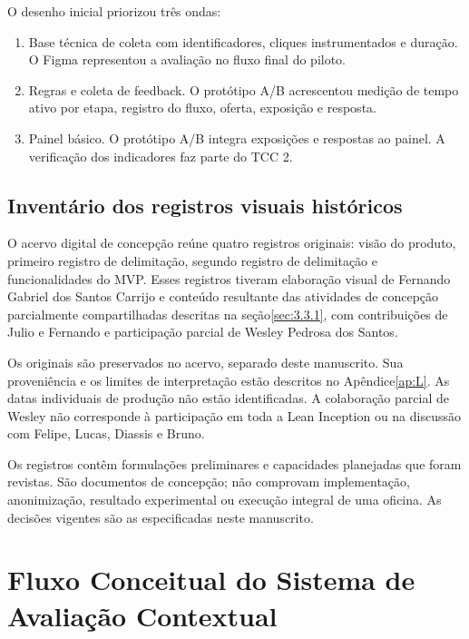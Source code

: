 \begin{apendicesenv}
O desenho inicial priorizou três ondas:

\begin{enumerate}
\def\labelenumi{\arabic{enumi}.}

\item
  Base técnica de coleta com identificadores, cliques instrumentados e duração. O Figma representou a avaliação no fluxo final do piloto.
\item
  Regras e coleta de feedback. O protótipo A/B acrescentou medição de tempo ativo por etapa, registro do fluxo, oferta, exposição e resposta.
\item
  Painel básico. O protótipo A/B integra exposições e respostas ao painel. A verificação dos indicadores faz parte do TCC 2.
\end{enumerate}

\section{Inventário dos registros visuais históricos}
\label{sec:A.4}

O acervo digital de concepção reúne quatro registros originais: visão do produto, primeiro registro de delimitação, segundo registro de delimitação e funcionalidades do MVP. Esses registros tiveram elaboração visual de Fernando Gabriel dos Santos Carrijo e conteúdo resultante das atividades de concepção parcialmente compartilhadas descritas na seção\nobreakspace{}\ref{sec:3.3.1}, com contribuições de Julio e Fernando e participação parcial de Wesley Pedrosa dos Santos.

Os originais são preservados no acervo, separado deste manuscrito. Sua proveniência e os limites de interpretação estão descritos no Apêndice\nobreakspace{}\ref{ap:L}. As datas individuais de produção não estão identificadas. A colaboração parcial de Wesley não corresponde à participação em toda a Lean Inception ou na discussão com Felipe, Lucas, Diassis e Bruno.

Os registros contêm formulações preliminares e capacidades planejadas que foram revistas. São documentos de concepção; não comprovam implementação, anonimização, resultado experimental ou execução integral de uma oficina. As decisões vigentes são as especificadas neste manuscrito.

\chapter{Fluxo Conceitual do Sistema de Avaliação Contextual}
\label{ap:B}


\end{apendicesenv}
